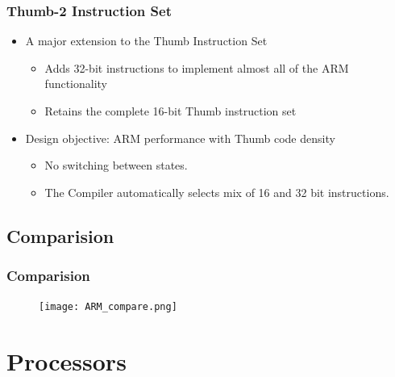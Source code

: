\documentclass{beamer}
\begin{document}


\begin{frame}
\frametitle{Thumb-2 Instruction Set}

\begin{itemize}
\item A major extension to the Thumb Instruction Set
\begin{itemize}
\item Adds 32-bit instructions to implement almost all of the ARM functionality
\item Retains the complete 16-bit Thumb instruction set
\end{itemize}
\item Design objective: ARM performance with Thumb code density
\begin{itemize}
\item No switching between states.
\item The Compiler automatically selects mix of 16 and 32 bit instructions.
\end{itemize}
\end{itemize}
\end{frame}

\subsection{Comparision}
\begin{frame}%
\frametitle{Comparision}
\begin{figure}
\texttt{[image: ARM\_compare.png]}
\end{figure}
\end{frame}



\section{Processors}
\end{document}
